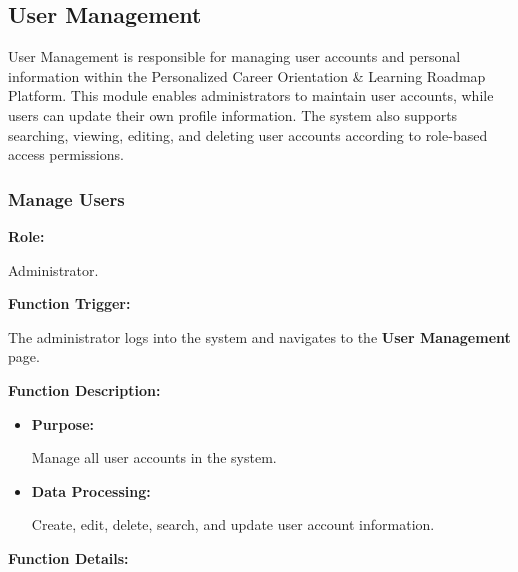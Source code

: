 

\subsection{User Management}

User Management is responsible for managing user accounts and personal information within the Personalized Career Orientation \& Learning Roadmap Platform. This module enables administrators to maintain user accounts, while users can update their own profile information. The system also supports searching, viewing, editing, and deleting user accounts according to role-based access permissions.
\subsubsection{Manage Users}

\textbf{Role:}

Administrator.

\vspace{0.3cm}

\textbf{Function Trigger:}

The administrator logs into the system and navigates to the \textbf{User Management} page.

\vspace{0.3cm}

\textbf{Function Description:}

\begin{itemize}
    \item \textbf{Purpose:}

    Manage all user accounts in the system.

    \item \textbf{Data Processing:}

    Create, edit, delete, search, and update user account information.
\end{itemize}

\vspace{0.3cm}

\textbf{Function Details:}

